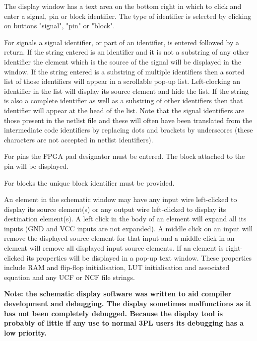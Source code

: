         The display window has a text area on the bottom right in which to
        click and enter a signal, pin or block identifier. The type of
        identifier is selected by clicking on buttons "signal", "pin" or
        "block".
        
        For signals a signal identifier, or part of an identifier, is entered
        followed by a return. If the string entered is an identifier and it is not
        a substring of any other identifier the element which is the source of the
        signal will be displayed in the window. If the string entered is a
        substring of multiple identifiers then a sorted list of those identifiers
        will appear in a scrollable pop-up list. Left-clocking an identifier in the
        list will display its source element and hide the list. If the string is
        also a complete identifier as well as a substring of other identifiers then
        that identifier will appear at the head of the list. Note that the signal
        identifiers are those present in the netlist file and these will often have
        been translated from the intermediate code identifiers by replacing
        dots and brackets by underscores (these characters are not accepted in
        netlist identifiers).
        
        For pins the FPGA pad designator must be entered. The block attached to
        the pin will be displayed.
        
        For blocks the unique block identifier must be provided.
        
        An element in the schematic window may have any input wire
        left-clicked to display its source element(s) or any output wire
        left-clicked to display its destination element(s). A left click in
        the body of an element will expand all its inputs (GND and VCC
        inputs are not expanded). A middle click on an input will remove the
        displayed source element for that input and a middle click in an
        element will remove all displayed input source elements. If an
        element is right-clicked its properties will be displayed in a
        pop-up text window. These properties include RAM and flip-flop
        initialisation, LUT initialisation and associated equation and any
        UCF or NCF file strings.
        
        {\bf Note: the schematic display software was written to aid
        compiler development and debugging. The display sometimes
        malfunctions as it has not been completely debugged. Because
        the display tool is probably of little if any use to normal
        3PL users its debugging has a low priority.}
